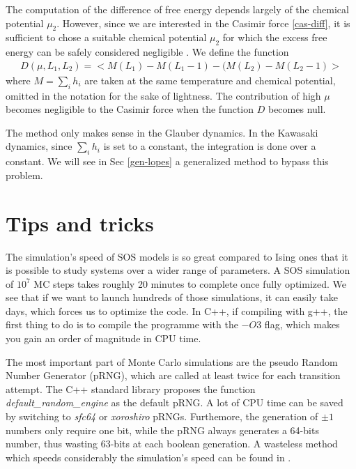 The computation of the difference of free energy depends largely of the chemical potential $\mu_2$. However, since we are interested in the Casimir force \eqref{cas-diff}, it is sufficient to chose a suitable chemical potential $\mu_2$ for which the excess free energy can be safely considered negligible \cite{lopes_cardozo_critical_2014} . We define the function
\begin{align}
    D(\mu,L_1,L_2) =  < M(L_1)-M(L_1-1) - (M(L_2)-M(L_2-1) >
    \label{function-d}
\end{align}
where $M=\sum_i h_i$ 
are taken at the same temperature and chemical potential, 
omitted in the notation for the sake of lightness. The contribution of high $\mu$ becomes negligible to the Casimir force when the function $D$ becomes null.


The method only makes sense in the Glauber dynamics. In the Kawasaki dynamics, since $\sum_i h_i$ is set to a constant, the integration is done over a constant. We will see in Sec \ref{gen-lopes} a generalized method to bypass this problem.

\section{Tips and tricks}

The simulation's speed of SOS models is so great compared to Ising ones that it is possible to study systems over a wider range of parameters. A SOS simulation of $10^7$ MC steps takes roughly 20 minutes to complete once fully optimized. We see that if we want to launch hundreds of those simulations, it can easily take days, which forces us to optimize the code.
In C++, if compiling with g++, the first thing to do is to compile the programme with the $-O3$ flag, which makes you gain an order of magnitude in CPU time.

The most important part of Monte Carlo simulations are the pseudo Random Number Generator (pRNG), which are called at least twice for each transition attempt. The C++ standard library proposes the function \textit{default\_random\_engine} as the default pRNG. A lot of CPU time can be saved by switching to \textit{sfc64} or \textit{xoroshiro} pRNGs. Furthemore, the generation of $\pm1$ numbers only require one bit, while the pRNG always generates a 64-bits number, thus wasting 63-bits at each boolean generation. A wasteless method which speeds considerably the simulation's speed can be found in \cite{ankerl_fast_nodate}.

